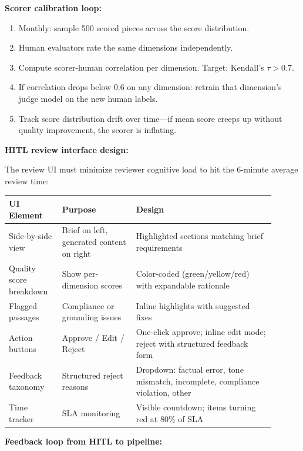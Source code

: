 \textbf{Scorer calibration loop:}

\begin{enumerate}
  \item Monthly: sample 500 scored pieces across the score distribution.
  \item Human evaluators rate the same dimensions independently.
  \item Compute scorer-human correlation per dimension. Target: Kendall's $\tau > 0.7$.
  \item If correlation drops below 0.6 on any dimension: retrain that dimension's judge model on the new human labels.
  \item Track score distribution drift over time---if mean score creeps up without quality improvement, the scorer is inflating.
\end{enumerate}

\textbf{HITL review interface design:}

The review UI must minimize reviewer cognitive load to hit the 6-minute average review time:

\begin{tabular}{|p{0.18\linewidth}|p{0.25\linewidth}|p{0.47\linewidth}|}
\hline
\textbf{UI Element} & \textbf{Purpose} & \textbf{Design} \\
\hline
Side-by-side view & Brief on left, generated content on right & Highlighted sections matching brief requirements \\
\hline
Quality score breakdown & Show per-dimension scores & Color-coded (green/yellow/red) with expandable rationale \\
\hline
Flagged passages & Compliance or grounding issues & Inline highlights with suggested fixes \\
\hline
Action buttons & Approve / Edit / Reject & One-click approve; inline edit mode; reject with structured feedback form \\
\hline
Feedback taxonomy & Structured reject reasons & Dropdown: factual error, tone mismatch, incomplete, compliance violation, other \\
\hline
Time tracker & SLA monitoring & Visible countdown; items turning red at 80\% of SLA \\
\hline
\end{tabular}

\textbf{Feedback loop from HITL to pipeline:}

